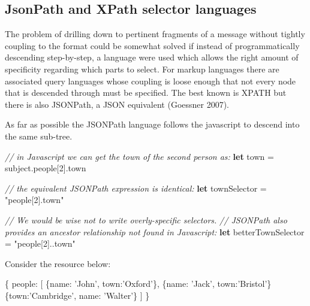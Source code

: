 \documentclass[]{article}
\newenvironment{Shaded}{}{}
\newcommand{\KeywordTok}[1]{\textcolor[rgb]{0.00,0.44,0.13}{\textbf{{#1}}}}
\newcommand{\DataTypeTok}[1]{\textcolor[rgb]{0.56,0.13,0.00}{{#1}}}
\newcommand{\DecValTok}[1]{\textcolor[rgb]{0.25,0.63,0.44}{{#1}}}
\newcommand{\StringTok}[1]{\textcolor[rgb]{0.25,0.44,0.63}{{#1}}}
\newcommand{\CommentTok}[1]{\textcolor[rgb]{0.38,0.63,0.69}{\textit{{#1}}}}
\newcommand{\OtherTok}[1]{\textcolor[rgb]{0.00,0.44,0.13}{{#1}}}
\newcommand{\FunctionTok}[1]{\textcolor[rgb]{0.02,0.16,0.49}{{#1}}}
\newcommand{\NormalTok}[1]{{#1}}
\begin{document}
\subsection{JsonPath and XPath selector languages}

\label{jsonpathxpath}

The problem of drilling down to pertinent fragments of a message without
tightly coupling to the format could be somewhat solved if instead of
programmatically descending step-by-step, a language were used which
allows the right amount of specificity regarding which parts to select.
For markup languages there are associated query languages whose coupling
is loose enough that not every node that is descended through must be
specified. The best known is XPATH but there is also JSONPath, a JSON
equivalent (Goessner 2007).

As far as possible the JSONPath language follows the javascript to
descend into the same sub-tree.

\begin{Shaded}
\begin{Highlighting}[]
\CommentTok{// in Javascript we can get the town of the second person as:}
\KeywordTok{let} \NormalTok{town = }\OtherTok{subject}\NormalTok{.}\FunctionTok{people}\NormalTok{[}\DecValTok{2}\NormalTok{].}\FunctionTok{town}

\CommentTok{// the equivalent JSONPath expression is identical:}
\KeywordTok{let} \NormalTok{townSelector = }\StringTok{"people[2].town"}

\CommentTok{// We would be wise not to write overly-specific selectors.}
\CommentTok{// JSONPath also provides an ancestor relationship not found in Javascript:}
\KeywordTok{let} \NormalTok{betterTownSelector = }\StringTok{"people[2]..town"}
\end{Highlighting}
\end{Shaded}

Consider the resource below:

\begin{Shaded}
\begin{Highlighting}[]
\NormalTok{\{}
   \DataTypeTok{people}\NormalTok{: [}
      \NormalTok{\{}\DataTypeTok{name}\NormalTok{: }\StringTok{'John'}\NormalTok{, }\DataTypeTok{town}\NormalTok{:}\StringTok{'Oxford'}\NormalTok{\},}
      \NormalTok{\{}\DataTypeTok{name}\NormalTok{: }\StringTok{'Jack'}\NormalTok{, }\DataTypeTok{town}\NormalTok{:}\StringTok{'Bristol'}\NormalTok{\}}
      \NormalTok{\{}\DataTypeTok{town}\NormalTok{:}\StringTok{'Cambridge'}\NormalTok{, }\DataTypeTok{name}\NormalTok{: }\StringTok{'Walter'}\NormalTok{\}}
   \NormalTok{]}
\NormalTok{\}}
\end{Highlighting}
\end{Shaded}
\end{document}
